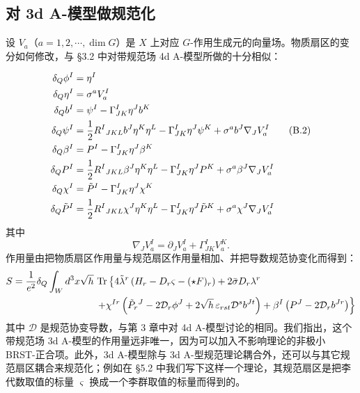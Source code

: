 
\subsection{对 3d A-模型做规范化}

设 $V_a$（$a=1,2,\cdots,\dim G$）是 $X$ 上对应 $G$-作用生成元的向量场。物质扇区的变分如何修改，与 §3.2 中对带规范场 4d A-模型所做的十分相似：

\begin{align}
  \delta_Q\phi^I &= \eta^I \notag\\
  \delta_Q\eta^I &= \sigma^aV^I_a \notag\\
  \delta_Qb^I &= \psi^I-\Gamma^I_{JK}\eta^Jb^K \notag\\
  \delta_Q\psi^I &= \frac12R^I{}_{JKL}b^J\eta^K\eta^L-\Gamma^I_{JK}\eta^J\psi^K+\sigma^ab^J\nabla_JV^I_a \tag{B.2}\\
  \delta_Q\beta^I &= P^I-\Gamma^I_{JK}\eta^J\beta^K \notag\\
  \delta_QP^I &= \frac12R^I{}_{JKL}\beta^J\eta^K\eta^L-\Gamma^I_{JK}\eta^JP^K+\sigma^a\beta^J\nabla_JV^I_a \notag\\
  \delta_Q\chi^I &= \tilde P^I-\Gamma^I_{JK}\eta^J\chi^K \notag\\
  \delta_Q\tilde P^I &= \frac12R^I{}_{JKL}\chi^J\eta^K\eta^L-\Gamma^I_{JK}\eta^J\tilde P^K+\sigma^a\chi^J\nabla_JV^I_a \notag
\end{align}
其中
\[
  \nabla_JV^I_a=\partial_JV^I_a+\Gamma^I_{JK}V^K_a.
\]
作用量由把物质扇区作用量与规范扇区作用量相加、并把导数规范协变化而得到：
\[
\begin{aligned}
  S=\frac{1}{e^2}\delta_Q\int_Wd^3x\sqrt{h}\,&\operatorname{Tr}\left\{4\tilde\lambda^r\left(H_r-D_r\varsigma-(\star F)_r\right)+2\bar\sigma D_r\lambda^r\right.\\
  &\left.+\chi^{Ir}\left(\tilde P_r{}^J-2\mathcal{D}_r\phi^J+2\sqrt{h}\,\varepsilon_{rst}\mathcal{D}^sb^{Jt}\right)+\beta^I\left(P^J-2\mathcal{D}_rb^{Jr}\right)\right\}
\end{aligned}
\]
其中 $\mathcal{D}$ 是规范协变导数，与第 3 章中对 4d A-模型讨论的相同。我们指出，这个带规范场 3d A-模型的作用量远非唯一，因为可以加入不影响理论的非极小 BRST-正合项。此外，3d A-模型除与 3d A-型规范理论耦合外，还可以与其它规范扇区耦合来规范化；例如在 §5.2 中我们写下这样一个理论，其规范扇区是把李代数取值的标量 $\varsigma$ 换成一个李群取值的标量而得到的。

